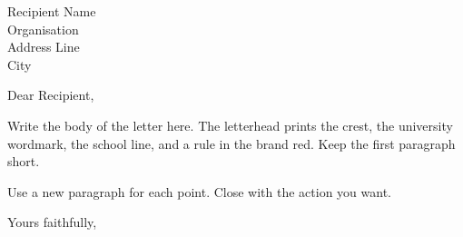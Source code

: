 \documentclass[letter,a4paper,11pt]{bangor}
\begin{document}
\begin{letter}{Recipient Name\\Organisation\\Address Line\\City}
\bangorletterhead
\opening{Dear Recipient,}

Write the body of the letter here. The letterhead prints the crest,
the university wordmark, the school line, and a rule in the brand
red. Keep the first paragraph short.

Use a new paragraph for each point. Close with the action you want.

\closing{Yours faithfully,}

\end{letter}
\end{document}
